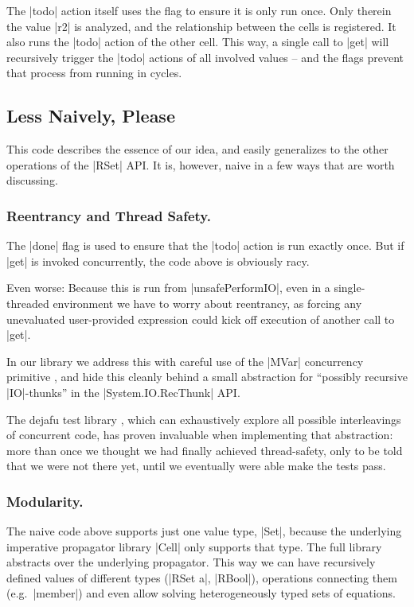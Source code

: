 \documentclass[manuscript,screen,acmsmall,nonacm]{acmart}
\begin{document}
The |todo| action itself uses the flag to ensure it is only run once. Only therein the value |r2| is analyzed, and the relationship between the cells is registered. It also runs the |todo| action of the other cell. This way, a single call to |get| will recursively trigger the |todo| actions of all involved values -- and the flags prevent that process from running in cycles.

\subsection{Less Naively, Please}

This code describes the essence of our idea, and easily generalizes to the other operations of the |RSet| API. It is, however, naive in a few ways that are worth discussing.

\subsubsection{Reentrancy and Thread Safety.}\label{sec:thread}

The |done| flag is used to ensure that the |todo| action is run exactly once. But if |get| is invoked concurrently, the code above is obviously racy.

Even worse: Because this is run from |unsafePerformIO|, even in a single-threaded environment we have to worry about reentrancy, as forcing any unevaluated user-provided expression could kick off execution of another call to |get|.

In our library we address this with careful use of the |MVar| concurrency primitive \cite{concurrent}, and hide this cleanly behind a small abstraction for “possibly recursive |IO|-thunks” in the |System.IO.RecThunk| API.

The dejafu test library \citep{dejafu}, which can exhaustively explore all possible interleavings of concurrent code, has proven invaluable when implementing that abstraction: more than once we thought we had finally achieved thread-safety, only to be told that we were not there yet, until we eventually were able make the tests pass.

\subsubsection{Modularity.}

The naive code above supports just one value type, |Set|, because the underlying imperative propagator library |Cell| only supports that type. The full library abstracts over the underlying propagator. This way we can have recursively defined values of different types (|RSet a|, |RBool|), operations connecting them (e.g.\ |member|) and even allow solving heterogeneously typed sets of equations.
\end{document}
